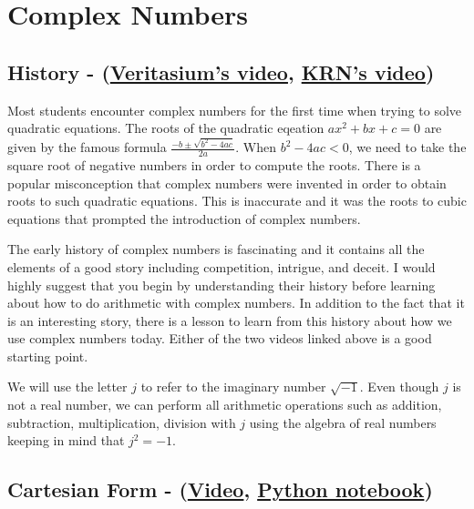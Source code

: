\chapter{Complex Numbers}

\section{History -
(\href{https://www.youtube.com/watch?v=cUzklzVXJwo}{Veritasium's video},
\href{https://youtu.be/UeRNIxt8o00}{KRN's video})}
Most students encounter complex numbers for the first time when trying to solve quadratic equations.
The roots of the quadratic eqeation $ax^2+bx+c = 0$ are given by the famous formula $\frac{-b \pm \sqrt{b^2-4ac}}{2a}$. When $b^2-4ac < 0$, we need to take the square root of negative numbers in order to compute the roots.  
There is a popular misconception that complex numbers were invented in order to obtain roots to such quadratic equations.
This is inaccurate and it was the roots to cubic equations that prompted the introduction of complex numbers.

The early history of complex numbers is fascinating and it contains all the elements of a good story including competition, intrigue, and deceit. I would highly suggest that you begin
by understanding their history before learning about how to do arithmetic with complex numbers.
In addition to the fact that it is an interesting story, there is a lesson to learn from this history about how we use complex numbers today.
Either of the two videos linked above is a good starting point.

We will use the letter $j$ to refer to the imaginary number $\sqrt{-1}$.
Even though $j$ is not a real number, we can perform all arithmetic operations such as addition, subtraction, multiplication, division with $j$ using the algebra of real numbers keeping in mind that $j^2=-1$.

\section{Cartesian Form - (\href{https://youtu.be/fUEwjQBs6FU}{Video},
\href{https://colab.research.google.com/drive/1IPisKbolmXp2UD7ZuxIRhMEjvaq_Q82G?usp=sharing}{Python notebook})}

